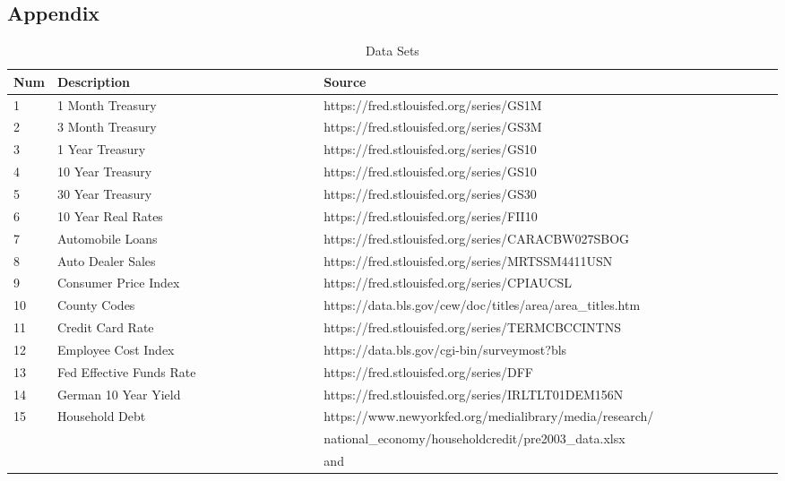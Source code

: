 \documentclass[sigconf,nonacm,11pt]{acmart}
\begin{document}



\appendix
\begin{appendix}

\section{Appendix}
\label{appendix:datasets}

\begin{table}[ht]
\caption{Data Sets}
\centering
\begin{tabular}{p{0.05\linewidth}p{0.35\linewidth}p{0.6\linewidth}}
\hline
Num & Description & Source\\
\hline
1 & 1 Month Treasury & https://fred.stlouisfed.org/series/GS1M\\
2 & 3 Month Treasury & https://fred.stlouisfed.org/series/GS3M\\
3 & 1 Year Treasury & https://fred.stlouisfed.org/series/GS10\\
4 & 10 Year Treasury & https://fred.stlouisfed.org/series/GS10\\
5 & 30 Year Treasury & https://fred.stlouisfed.org/series/GS30\\
6 & 10 Year Real Rates & https://fred.stlouisfed.org/series/FII10\\
7 & Automobile Loans & https://fred.stlouisfed.org/series/CARACBW027SBOG\\
8 & Auto Dealer Sales & https://fred.stlouisfed.org/series/MRTSSM4411USN\\
9 & Consumer Price Index & https://fred.stlouisfed.org/series/CPIAUCSL\\
10 & County Codes & https://data.bls.gov/cew/doc/titles/area/area\_titles.htm\\
11 & Credit Card Rate & https://fred.stlouisfed.org/series/TERMCBCCINTNS\\
12 & Employee Cost Index & https://data.bls.gov/cgi-bin/surveymost?bls\\
13 & Fed Effective Funds Rate  & https://fred.stlouisfed.org/series/DFF\\
14 & German 10 Year Yield & https://fred.stlouisfed.org/series/IRLTLT01DEM156N\\
15 & Household Debt & https://www.newyorkfed.org/medialibrary/media/research/\\
 & & national\_economy/householdcredit/pre2003\_data.xlsx\\ 
 & & and\\

\end{tabular}
\end{table}
\end{appendix}
\end{document}

